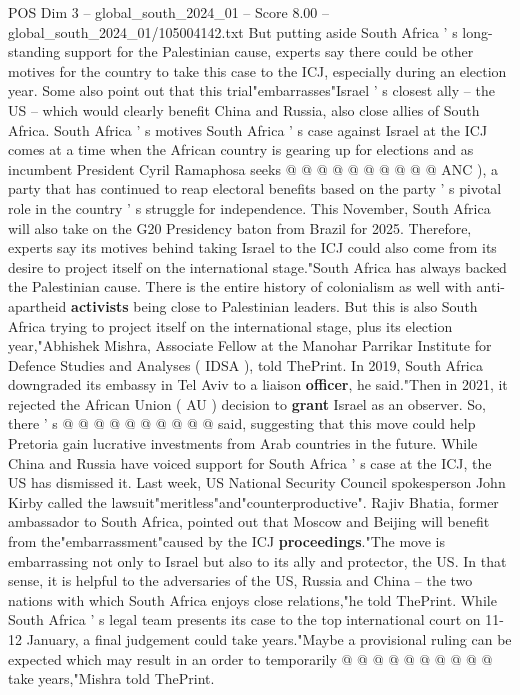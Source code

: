 \begin{textsample}{POS Dim 3 – global\_south\_2024\_01 – Score 8.00 – global\_south\_2024\_01/105004142.txt}
But putting aside South Africa ' s long-standing support for the Palestinian cause, experts say there could be other motives for the country to take this case to the ICJ, especially during an election year.
Some also point out that this trial"embarrasses"Israel ' s closest ally -- the US -- which would clearly benefit China and Russia, also close allies of South Africa.
South Africa ' s motives South Africa ' s case against Israel at the ICJ comes at a time when the African country is gearing up for elections and as incumbent President Cyril Ramaphosa seeks @ @ @ @ @ @ @ @ @ @ ANC ), a party that has continued to reap electoral benefits based on the party ' s pivotal role in the country ' s struggle for independence.
This November, South Africa will also take on the G20 Presidency baton from Brazil for 2025.
Therefore, experts say its motives behind taking Israel to the ICJ could also come from its desire to project itself on the international stage."South Africa has always backed the Palestinian cause.
There is the entire history of colonialism as well with anti-apartheid \textbf{activists} being close to Palestinian leaders.
But this is also South Africa trying to project itself on the international stage, plus its election year,"Abhishek Mishra, Associate Fellow at the Manohar Parrikar Institute for Defence Studies and Analyses ( IDSA ), told ThePrint.
In 2019, South Africa downgraded its embassy in Tel Aviv to a liaison \textbf{officer}, he said."Then in 2021, it rejected the African Union ( AU ) decision to \textbf{grant} Israel as an observer.
So, there ' s @ @ @ @ @ @ @ @ @ @ said, suggesting that this move could help Pretoria gain lucrative investments from Arab countries in the future.
While China and Russia have voiced support for South Africa ' s case at the ICJ, the US has dismissed it.
Last week, US National Security Council spokesperson John Kirby called the lawsuit"meritless"and"counterproductive".
Rajiv Bhatia, former ambassador to South Africa, pointed out that Moscow and Beijing will benefit from the"embarrassment"caused by the ICJ \textbf{proceedings}."The move is embarrassing not only to Israel but also to its ally and protector, the US.
In that sense, it is helpful to the adversaries of the US, Russia and China -- the two nations with which South Africa enjoys close relations,"he told ThePrint.
While South Africa ' s legal team presents its case to the top international court on 11-12 January, a final judgement could take years."Maybe a provisional ruling can be expected which may result in an order to temporarily @ @ @ @ @ @ @ @ @ @ take years,"Mishra told ThePrint.

\end{textsample}

